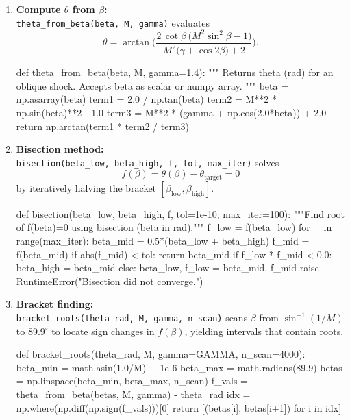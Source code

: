 \begin{enumerate}[label=-, leftmargin=*, itemsep=1em]
    \item \textbf{Compute \(\theta\) from \(\beta\):}\\
    \texttt{theta\_from\_beta(beta, M, gamma)} evaluates
    \[
        \theta = \arctan\!\Biggl(
            \frac{2\,\cot\beta\,\bigl(M^2\sin^2\beta - 1\bigr)}
                 {M^2\bigl(\gamma + \cos2\beta\bigr) + 2}
        \Biggr).
    \]
    \begin{pycode}
def theta_from_beta(beta, M, gamma=1.4):
    """
    Returns theta (rad) for an oblique shock.
    Accepts beta as scalar or numpy array.
    """
    beta = np.asarray(beta)
    term1 = 2.0 / np.tan(beta)
    term2 = M**2 * np.sin(beta)**2 - 1.0
    term3 = M**2 * (gamma + np.cos(2.0*beta)) + 2.0
    return np.arctan(term1 * term2 / term3)
    \end{pycode}

    \item \textbf{Bisection method:}\\
    \texttt{bisection(beta\_low, beta\_high, f, tol, max\_iter)} solves
    \[
        f(\beta) = \theta(\beta) - \theta_{\mathrm{target}} = 0
    \]
    by iteratively halving the bracket \([\beta_{\mathrm{low}},\beta_{\mathrm{high}}]\).
    \begin{pycode}
def bisection(beta_low, beta_high, f, tol=1e-10, max_iter=100):
    """Find root of f(beta)=0 using bisection (beta in rad)."""
    f_low = f(beta_low)
    for _ in range(max_iter):
        beta_mid = 0.5*(beta_low + beta_high)
        f_mid = f(beta_mid)
        if abs(f_mid) < tol:
            return beta_mid
        if f_low * f_mid < 0.0:
            beta_high = beta_mid
        else:
            beta_low, f_low = beta_mid, f_mid
    raise RuntimeError("Bisection did not converge.")
    \end{pycode}

    \item \textbf{Bracket finding:}\\
    \texttt{bracket\_roots(theta\_rad, M, gamma, n\_scan)} scans \(\beta\) from
    \(\sin^{-1}(1/M)\) to \(89.9^\circ\) to locate sign changes in
    \(f(\beta)\), yielding intervals that contain roots.
    \begin{pycode}
def bracket_roots(theta_rad, M, gamma=GAMMA, n_scan=4000):
    beta_min = math.asin(1.0/M) + 1e-6
    beta_max = math.radians(89.9)
    betas = np.linspace(beta_min, beta_max, n_scan)
    f_vals = theta_from_beta(betas, M, gamma) - theta_rad
    idx = np.where(np.diff(np.sign(f_vals)))[0]
    return [(betas[i], betas[i+1]) for i in idx]
    \end{pycode}


\end{enumerate}
